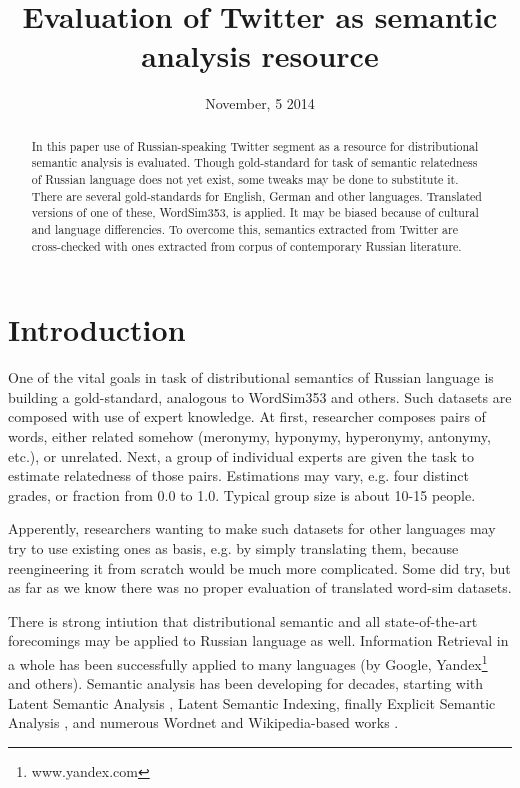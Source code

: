 \documentclass[11pt,letterpaper]{article}
\title{Evaluation of Twitter as semantic analysis resource}
\author{}
\date{November, 5 2014}
\begin{document}
\maketitle
\begin{abstract}
  In this paper use of Russian-speaking Twitter segment as a resource for distributional
  semantic analysis is evaluated. Though gold-standard for task of semantic relatedness
  of Russian language does not yet exist, some tweaks may be done to substitute it.  
  There are several gold-standards for English, German and other languages. 
  Translated versions of one of these, WordSim353, is applied.  It may be biased because of 
  cultural and language differencies. To overcome this, semantics extracted from Twitter
  are cross-checked with ones extracted from corpus of contemporary Russian literature.
\end{abstract}

\section{Introduction}

One of the vital goals in task of distributional semantics of Russian language is building
a gold-standard, analogous to WordSim353 \cite{finkelstein2001placing} and others. 
Such datasets are composed with use of expert knowledge. At first, researcher composes pairs
of words, either related somehow (meronymy, hyponymy, hyperonymy, antonymy, etc.), or unrelated.
Next, a group of individual experts are given the task to estimate relatedness of those pairs.
Estimations may vary, e.g. four distinct grades, or fraction from 0.0 to 1.0. Typical group size is 
about 10-15 people.

Apperently, researchers wanting to make such datasets for other languages may try to use existing
ones as basis, e.g. by simply translating them, because reengineering it from scratch would be much more
complicated. Some did try, but as far as we know there was no proper evaluation of translated word-sim
datasets.

There is strong intiution that distributional semantic and all state-of-the-art forecomings may
be applied to Russian language as well. Information Retrieval in a whole has been successfully applied
to many languages (by Google, Yandex\footnote{www.yandex.com} and others). Semantic analysis
has been developing for decades, starting with Latent Semantic Analysis \cite{landauer1998introduction}, 
Latent Semantic Indexing, finally Explicit Semantic Analysis \cite{gabrilovich2007computing}, and numerous
Wordnet and Wikipedia-based works \cite{zesch2008extracting}.
\end{document}
